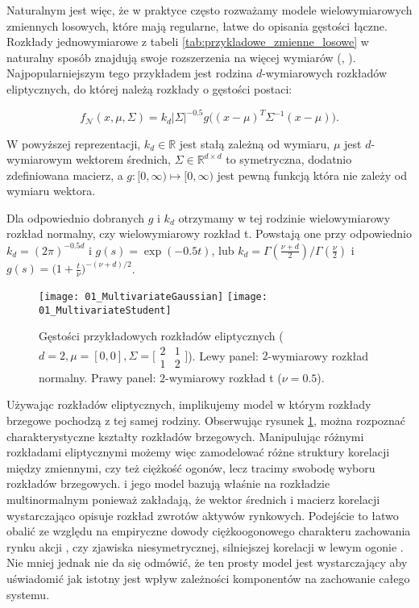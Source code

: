 Naturalnym jest więc, że w praktyce często rozważamy modele wielowymiarowych zmiennych losowych, które mają regularne, łatwe do opisania gęstości łączne. Rozkłady jednowymiarowe z tabeli \ref{tab:przykladowe_zmienne_losowe} w naturalny sposób znajdują swoje rozszerzenia na więcej wymiarów (\cite{MultivariateDistributions}, \cite{Cherubini_Copula_Methods_in_Finance}). Najpopularniejszym tego przykładem jest rodzina $d$-wymiarowych rozkładów eliptycznych, do której należą rozkłady o gęstości postaci:

$$ f_{\mathcal{N}}(x, \mu, \Sigma) = k_d \vert\Sigma\vert^{-0.5}g\big((x-\mu)^T\Sigma^{-1}(x-\mu)\big).$$

W powyższej reprezentacji, $k_d \in\mathbb{R}$ jest stałą zależną od wymiaru, $\mu$ jest $d$-wymiarowym wektorem średnich, $\Sigma \in \mathbb{R}^{d \times d}$ to symetryczna, dodatnio zdefiniowana macierz, a $g \colon [0, \infty) \mapsto [0, \infty)$ jest pewną funkcją która nie zależy od wymiaru wektora.

Dla odpowiednio dobranych $g$ i $k_d$ otrzymamy w tej rodzinie wielowymiarowy rozkład normalny, czy wielowymiarowy rozkład t. Powstają one przy odpowiednio $k_d=(2\pi)^{-0.5d}$ i $g(s) = \exp(-0.5 t)$, lub $k_d=\Gamma(\frac{\nu + d}{2})/\Gamma(\frac{\nu}{2})$ i $g(s) = \big(1 + \frac{t}{\nu})^{-(\nu + d)/2}$.
\begin{figure}[H]
	\centering
	\texttt{[image: 01\_MultivariateGaussian]}	\texttt{[image: 01\_MultivariateStudent]}
	\caption{Gęstości przykładowych rozkładów eliptycznych ($d=2, \mu=[0, 0], \Sigma = \big[\begin{smallmatrix}2&1\\1&2\end{smallmatrix}\big]$). Lewy panel: $2$-wymiarowy rozkład normalny. Prawy panel: $2$-wymiarowy rozkład t ($\nu = 0.5$).\label{fig:multivariate_gaussian_student}}
\end{figure}

Używając rozkładów eliptycznych, implikujemy model w którym rozkłady brzegowe pochodzą z tej samej rodziny. Obserwując rysunek \ref{fig:multivariate_gaussian_student}, można rozpoznać charakterystyczne kształty rozkładów brzegowych. Manipulując różnymi rozkładami eliptycznymi możemy więc zamodelować różne struktury korelacji między zmiennymi, czy też ciężkość ogonów, lecz tracimy swobodę wyboru rozkładów brzegowych. \cite{Markovitz_MPT} i jego model bazują właśnie na rozkładzie multinormalnym ponieważ zakładają, że wektor średnich i macierz korelacji wystarczająco opisuje rozkład zwrotów aktywów rynkowych. Podejście to łatwo obalić ze względu na empiryczne dowody ciężkoogonowego charakteru zachowania rynku akcji \cite{Mandelbrot_NonGaussianity}, czy zjawiska niesymetrycznej, silniejszej korelacji w lewym ogonie \cite{Kurowicka_Dependence_Modeling}. Nie mniej jednak nie da się odmówić, że ten prosty model jest wystarczający aby uświadomić jak istotny jest wpływ zależności komponentów na zachowanie całego systemu.\\